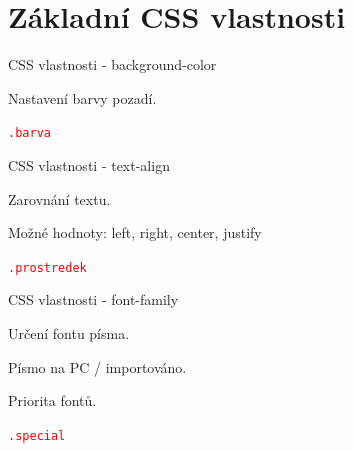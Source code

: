 \documentclass[aspectratio=169]{beamer}
\begin{document}
\section{Základní CSS vlastnosti}

\begin{frame}{CSS vlastnosti - background-color}
    \begin{cardTiny}
        Nastavení barvy pozadí.

        \begin{alltt}
            \textcolor{red}{.barva} \string{\\
                \textcolor{blue}{background-color}: \textcolor{orange}{white};\\
            \string}
        \end{alltt}
    \end{cardTiny}
\end{frame}

\begin{frame}{CSS vlastnosti - text-align}
    \begin{cardTiny}
        Zarovnání textu.

        Možné hodnoty: left, right, center, justify

        \begin{alltt}
            \textcolor{red}{.prostredek} \string{\\
                \textcolor{blue}{text-align}: \textcolor{orange}{center};\\
            \string}
        \end{alltt}
    \end{cardTiny}
\end{frame}

\begin{frame}{CSS vlastnosti - font-family}
    \begin{cardTiny}
        Určení fontu písma.

        Písmo na PC / importováno.

        Priorita fontů.

        \begin{alltt}
            \textcolor{red}{.special} \string{\\
                \textcolor{blue}{font-family}: \textcolor{orange}{"Times New Roman", "Roboto", serif};\\
            \string}
        \end{alltt}
    \end{cardTiny}
\end{frame}
\end{document}
